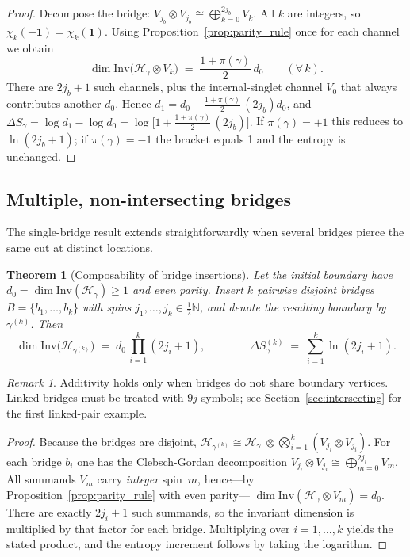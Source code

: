 \documentclass[11pt, a4paper]{article}
\theoremstyle{plain}
\newtheorem{theorem}{Theorem}[section]
\theoremstyle{definition}
\theoremstyle{remark}
\newtheorem*{remark}{Remark}
\newcommand{\Hil}{\mathcal{H}}
\newcommand{\Inv}{\mathrm{Inv}}
\begin{document}
\begin{proof}
Decompose the bridge:
\(V_{j_b}\otimes V_{j_b}\cong\bigoplus_{k=0}^{2j_b}V_k\).
All $k$ are integers, so \(\chi_k(-\mathbf1)=\chi_k(\mathbf1)\).
Using Proposition~\ref{prop:parity_rule} once for each channel we obtain  
\[  \dim\Inv\bigl(\Hil_{\gamma}\otimes V_k\bigr)  \;=\;  \frac{1+\pi(\gamma)}2\,d_0  \qquad (\forall\,k).\]
There are \(2j_b+1\) such channels, plus the internal-singlet channel
\(V_0\) that always contributes another \(d_0\).
Hence
\(
  d_1
  =d_0
   +\frac{1+\pi(\gamma)}2\,(2j_b)d_0
\),
and
\(
  \Delta S_{\gamma}
  =\log d_1-\log d_0
  =\log\!\bigl[1+\frac{1+\pi(\gamma)}2\,(2j_b)\bigr].
\)
If \(\pi(\gamma)=+1\) this reduces to \(\ln(2j_b+1)\); if
\(\pi(\gamma)=-1\) the bracket equals 1 and the entropy is unchanged.
\end{proof}

\subsection{Multiple, non-intersecting bridges}

The single-bridge result extends straightforwardly when several
bridges pierce the same cut at distinct locations.

\begin{theorem}[Composability of bridge insertions]
\label{thm:multi}
Let the initial boundary have
$d_{0}=\dim \Inv(\Hil_{\gamma})\ge 1$
and even parity.
Insert $k$ pairwise disjoint bridges
$B=\{b_{1},\dots,b_{k}\}$ with spins
$j_{1},\dots,j_{k}\in \tfrac12\mathbb{N}$,
and denote the resulting boundary by $\gamma^{(k)}$.
Then
\[ \dim \Inv\!\bigl(\Hil_{\gamma^{(k)}}\bigr)   \;=\;   d_{0}\,\prod_{i=1}^{k} (2j_{i}+1), \qquad\qquad \Delta S_{\gamma}^{(k)}   \;=\;   \sum_{i=1}^{k}\ln (2j_{i}+1).\]
\end{theorem}

\begin{remark}
Additivity holds only when bridges do not share boundary vertices. Linked bridges must be treated with $9j$-symbols; see Section~\ref{sec:intersecting} for the first linked-pair example.
\end{remark}

\begin{proof}
Because the bridges are disjoint,
\(
 \Hil_{\gamma^{(k)}}
 \cong
 \Hil_{\gamma}\;
 \otimes\!
 \bigotimes_{i=1}^{k} (V_{j_{i}}\!\otimes V_{j_{i}}).
\)
For each bridge $b_{i}$ one has the Clebsch-Gordan decomposition
$V_{j_{i}}\otimes V_{j_{i}}\cong\bigoplus_{m=0}^{2j_{i}} V_{m}$.
All summands $V_{m}$ carry \emph{integer} spin~$m$,
hence—by Proposition~\ref{prop:parity_rule} with even parity—
$\dim\Inv(\Hil_{\gamma}\otimes V_{m})=d_{0}$.
There are exactly $2j_{i}+1$ such summands, so the
invariant dimension is multiplied by that factor for each bridge.
Multiplying over $i=1,\dots,k$ yields the stated product,
and the entropy increment follows by taking the logarithm.
\end{proof}
\end{document}

